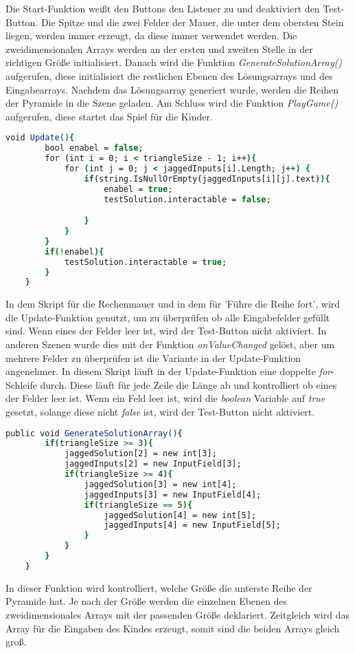 Die Start-Funktion weißt den Buttons den Listener zu und deaktiviert den Test-Button. Die Spitze und die zwei Felder der Mauer, die unter dem obersten Stein liegen, werden immer erzeugt, da diese immer verwendet werden. Die zweidimensionalen Arrays werden an der ersten und zweiten Stelle in der richtigen Größe initialisiert. Danach wird die Funktion \textit{GenerateSolutionArray()} aufgerufen, diese initialisiert die restlichen Ebenen des Lösungsarrays und des Eingabearrays. Nachdem das Lösungsarray generiert wurde, werden die Reihen der Pyramide in die Szene geladen. Am Schluss wird die Funktion \textit{PlayGame()} aufgerufen, diese startet das Spiel für die Kinder.\\
\begin{lstlisting}[language=csh, caption={Triangle.cs Update-Funktion}]
	void Update(){
		bool enabel = false;
		for (int i = 0; i < triangleSize - 1; i++){
			for (int j = 0; j < jaggedInputs[i].Length; j++) {
				if(string.IsNullOrEmpty(jaggedInputs[i][j].text)){
					enabel = true;
					testSolution.interactable = false;

				}
			}
		}
		if(!enabel){
			testSolution.interactable = true;
		}
	}
\end{lstlisting}
In dem Skript für die Rechenmauer und in dem für 'Führe die Reihe fort', wird die Update-Funktion genutzt, um zu überprüfen ob alle Eingabefelder gefüllt sind. Wenn eines der Felder leer ist, wird der Test-Button nicht aktiviert. In anderen Szenen wurde dies mit der Funktion \textit{onValueChanged} gelöst, aber um mehrere Felder zu überprüfen ist die Variante in der Update-Funktion angenehmer. In diesem Skript läuft in der Update-Funktion eine doppelte \textit{for}-Schleife durch. Diese läuft für jede Zeile die Länge ab und kontrolliert ob eines der Felder leer ist. Wenn ein Feld leer ist, wird die \textit{boolean} Variable auf \textit{true} gesetzt, solange diese nicht \textit{false} ist, wird der Test-Button nicht aktiviert.\\
\begin{lstlisting}[language=csh, caption={Triangle.cs GenerateSolutionArray-Funktion}]
	public void GenerateSolutionArray(){
		if(triangleSize >= 3){
			jaggedSolution[2] = new int[3];
			jaggedInputs[2] = new InputField[3];
			if(triangleSize >= 4){
				jaggedSolution[3] = new int[4];
				jaggedInputs[3] = new InputField[4];
				if(triangleSize == 5){
					jaggedSolution[4] = new int[5];
					jaggedInputs[4] = new InputField[5];
				}
			}
		}
	}
\end{lstlisting}
In dieser Funktion wird kontrolliert, welche Größe die unterste Reihe der Pyramide hat. Je nach der Größe werden die einzelnen Ebenen des zweidimensionales Arrays mit der passenden Größe deklariert. Zeitgleich wird das Array für die Eingaben des Kindes erzeugt, somit sind die beiden Arrays gleich groß.\\
